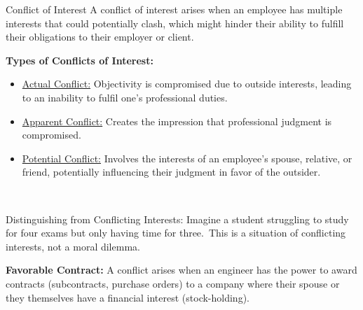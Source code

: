 \documentclass[11pt]{beamer}
\begin{document}
    \begin{frame}[t,allowframebreaks]{Conflict of Interest}
        A conflict of interest arises when an employee has multiple interests that could potentially clash, which might
        hinder their ability to fulfill their obligations to their employer or client.\\[10pt]
        \begin{minipage}[t]{0.6\textwidth}
            \small
            \textbf{Types of Conflicts of Interest:}
            \begin{itemize}
                \item \ul{Actual Conflict:} Objectivity is compromised due to outside interests, leading to an inability
                to fulfil one's professional duties.
                \item \ul{Apparent Conflict:} Creates the impression that professional judgment is compromised.
                \item \ul{Potential Conflict:} Involves the interests of an employee's spouse, relative, or friend,
                potentially influencing their judgment in favor of the outsider.
            \end{itemize}
        \end{minipage}
        \begin{minipage}[t]{0.05\textwidth}
            ~
        \end{minipage}
        \begin{minipage}[t]{0.3\textwidth}
            \small
            \vspace*{-8pt}
            \begin{block}{Distinguishing from Conflicting Interests:}
                \footnotesize
                Imagine a student struggling to study for four exams but only having time for three.\ This is a
                situation of conflicting interests, not a moral dilemma.
            \end{block}
        \end{minipage}

        \framebreak

        \textbf{Favorable Contract:}
        A conflict arises when an engineer has the power to award contracts (subcontracts, purchase orders) to a
        company where their spouse or they themselves have a financial interest (stock-holding).
        \\[10pt]


\end{frame}
\end{document}
